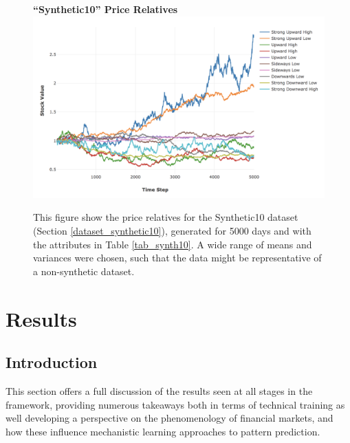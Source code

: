 \documentclass[a4paper,11pt,oneside]{article}
\theoremstyle{plain}
\theoremstyle{definition}
\begin{document}
	
	
	\begin{figure}[H]
		\centering
		\textbf{``Synthetic10'' Price Relatives}
		\includegraphics[scale=0.45]{images/results/prices/synthetic10_prices.png} 
		\caption[Synthetic10 Price Relatives]{This figure show the price relatives for the Synthetic10 dataset (Section \ref{dataset_synthetic10}), generated for 5000 days and with the attributes in Table \ref{tab_synth10}. A wide range of means and variances were chosen, such that the data might be representative of a non-synthetic dataset.}
		\label{figure-synthetic10_prices}
	\end{figure}
	

	
	
	
	
	
	
	
	
	
	\newpage
	\section{Results}\label{Results}
	\subsection{Introduction}\label{results_into}
	
	This section offers a full discussion of the results seen at all stages in the framework, providing numerous takeaways both in terms of technical training as well developing a perspective on the phenomenology of financial markets, and how these influence mechanistic learning approaches to pattern prediction. \newline
	
\end{document}

